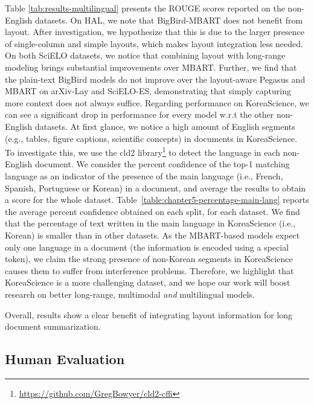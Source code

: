 Table \ref{tab:results-multilingual} presents the ROUGE scores reported on the non-English datasets. 
On HAL, we note that BigBird-MBART does not benefit from layout. After investigation, we hypothesize that this is due to the larger presence of single-column and simple layouts, which makes layout integration less needed.
On both SciELO datasets, we notice that combining layout with long-range modeling brings substantial improvements over MBART.
Further, we find that the plain-text BigBird models do not improve over the layout-aware Pegasus and MBART on arXiv-Lay and SciELO-ES, demonstrating that simply capturing more context does not always suffice. 
Regarding performance on KoreaScience, we can see a significant drop in performance for every model w.r.t the other non-English datasets. At first glance, we notice a high amount of English segments (e.g., tables, figure captions, scientific concepts) in documents in KoreaScience. To investigate this, we use the cld2 library\footnote{\url{https://github.com/GregBowyer/cld2-cffi}} to detect the language in each non-English document. We consider the percent confidence of the top-1 matching language as an indicator of the presence of the main language (i.e., French, Spanish, Portuguese or Korean) in a document, and average the results to obtain a score for the whole dataset. Table~\ref{table:chapter5-percentage-main-lang} reports the average percent confidence obtained on each split, for each dataset. We find that the percentage of text written in the main language in KoreaScience (i.e., Korean) is smaller than in other datasets. As the MBART-based models expect only one language in a document (the information is encoded using a special token), we claim the strong presence of non-Korean segments in KoreaScience causes them to suffer from interference problems. Therefore, we highlight that KoreaScience is a more challenging dataset, and we hope our work will boost research on better long-range, multimodal \textit{and} multilingual models.

Overall, results show a clear benefit of integrating layout information for long document summarization. 

\subsection{Human Evaluation}

